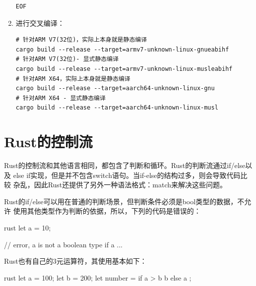 \begin{enumerate}
\begin{mdframed}[topline=false, bottomline=false, leftline=false,
    rightline=false, backgroundcolor=lbcolor]
\begin{verbatim}
EOF
\end{verbatim}
\end{mdframed}

  \item 进行交叉编译：
\begin{mdframed}[topline=false, bottomline=false, leftline=false,
    rightline=false, backgroundcolor=lbcolor]
\begin{verbatim}
# 针对ARM V7(32位)，实际上本身就是静态编译
cargo build --release --target=armv7-unknown-linux-gnueabihf
# 针对ARM V7(32位)- 显式静态编译
cargo build --release --target=armv7-unknown-linux-musleabihf
# 针对ARM X64，实际上本身就是静态编译
cargo build --release --target=aarch64-unknown-linux-gnu
# 针对ARM X64 - 显式静态编译
cargo build --release --target=aarch64-unknown-linux-musl
\end{verbatim}
\end{mdframed}

\end{enumerate}

\section{Rust的控制流}
Rust的控制流和其他语言相同，都包含了判断和循环。Rust的判断流通过if/else以及
else if实现，但是并不包含switch语句。当if-else的结构过多，则会导致代码比较
杂乱，因此Rust还提供了另外一种语法格式：match来解决这些问题。

Rust的if/else可以用在普通的判断场景，但判断条件必须是bool类型的数据，不允许
使用其他类型作为判断的依据，所以，下列的代码是错误的：
\begin{code-block}{rust}
let a = 10;

// error, a is not a boolean type
if a {
    ...
}
\end{code-block}

Rust也有自己的3元运算符，其使用基本如下：
\begin{code-block}{rust}
let a = 100;
let b = 200;
let number = if a > b {
    b
} else {
    a
};

\end{code-block}

